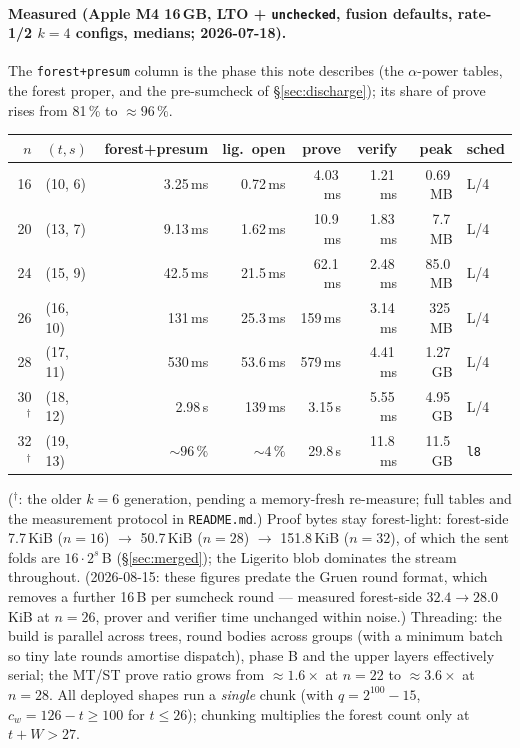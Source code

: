 \documentclass[11pt]{article}
\newcommand{\cw}{c_w}
\newcommand{\code}[1]{{\def\_{\textunderscore\allowbreak}\texttt{#1}}}
\theoremstyle{definition}
\begin{document}
\paragraph{Measured (Apple M4 16\,GB, LTO + \code{unchecked}, fusion
defaults, rate-1/2 $k{=}4$ configs, medians; 2026-07-18).}
The \code{forest+presum} column is the phase this note describes (the
$\alpha$-power tables, the forest proper, and the pre-sumcheck of
\S\ref{sec:discharge}); its share of prove rises from 81\,\% to
${\approx}96\,\%$.
\begin{center}
\small
\begin{tabular}{rlrrrrrl}
\toprule
$n$ & $(t, s)$ & forest+presum & lig.\ open & prove & verify & peak & sched \\
\midrule
16 & (10, 6)  & 3.25\,ms & 0.72\,ms & 4.03\,ms & 1.21\,ms & 0.69\,MB & L/4 \\
20 & (13, 7)  & 9.13\,ms & 1.62\,ms & 10.9\,ms & 1.83\,ms & 7.7\,MB  & L/4 \\
24 & (15, 9)  & 42.5\,ms & 21.5\,ms & 62.1\,ms & 2.48\,ms & 85.0\,MB & L/4 \\
26 & (16, 10) & 131\,ms  & 25.3\,ms & 159\,ms  & 3.14\,ms & 325\,MB  & L/4 \\
28 & (17, 11) & 530\,ms  & 53.6\,ms & 579\,ms  & 4.41\,ms & 1.27\,GB & L/4 \\
30$^\dagger$ & (18, 12) & 2.98\,s & 139\,ms & 3.15\,s & 5.55\,ms & 4.95\,GB & L/4 \\
32$^\dagger$ & (19, 13) & ${\sim}96\,\%$ & ${\sim}4\,\%$ & 29.8\,s & 11.8\,ms & 11.5\,GB & \code{l8} \\
\bottomrule
\end{tabular}
\end{center}
($^\dagger$: the older $k{=}6$ generation, pending a memory-fresh
re-measure; full tables and the measurement protocol in
\code{README.md}.)  Proof bytes stay forest-light: forest-side
7.7\,KiB ($n{=}16$) $\to$ 50.7\,KiB ($n{=}28$) $\to$ 151.8\,KiB
($n{=}32$), of which the sent folds are $16\cdot2^s$\,B
(\S\ref{sec:merged}); the Ligerito blob dominates the stream
throughout.  (2026-08-15: these figures predate the Gruen round format,
which removes a further 16\,B per sumcheck round --- measured
forest-side $32.4 \to 28.0$\,KiB at $n = 26$, prover and verifier time
unchanged within noise.)  Threading: the build is parallel across trees, round
bodies across groups (with a minimum batch so tiny late rounds amortise
dispatch), phase B and the upper layers effectively serial; the
MT/ST prove ratio grows from ${\approx}1.6\times$ at $n = 22$ to
${\approx}3.6\times$ at $n = 28$.  All deployed shapes run a
\emph{single} chunk (with $q = 2^{100}{-}15$, $\cw = 126 - t \ge 100$
for $t \le 26$); chunking multiplies the forest count only at
$t + W > 27$.
\end{document}
